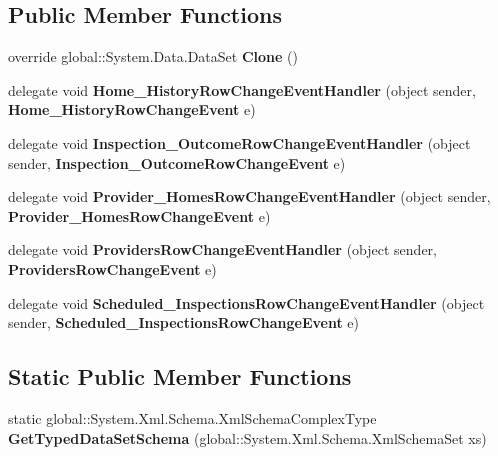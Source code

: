 \subsection*{Public Member Functions}
\begin{DoxyCompactItemize}
\item 
\mbox{\label{class_a_f_h___scheduler_1_1_home_inspection_data_set_a0c26672e3af1576d1e41972377c41660}} 
override global\+::\+System.\+Data.\+Data\+Set {\bfseries Clone} ()
\item 
\mbox{\label{class_a_f_h___scheduler_1_1_home_inspection_data_set_a18755c0086a65c9383ad21393a136f69}} 
delegate void {\bfseries Home\+\_\+\+History\+Row\+Change\+Event\+Handler} (object sender, \textbf{ Home\+\_\+\+History\+Row\+Change\+Event} e)
\item 
\mbox{\label{class_a_f_h___scheduler_1_1_home_inspection_data_set_a25cfb2a40648751561167509d949e2af}} 
delegate void {\bfseries Inspection\+\_\+\+Outcome\+Row\+Change\+Event\+Handler} (object sender, \textbf{ Inspection\+\_\+\+Outcome\+Row\+Change\+Event} e)
\item 
\mbox{\label{class_a_f_h___scheduler_1_1_home_inspection_data_set_a75d223ce70ef4ddb10e760fa13d78f54}} 
delegate void {\bfseries Provider\+\_\+\+Homes\+Row\+Change\+Event\+Handler} (object sender, \textbf{ Provider\+\_\+\+Homes\+Row\+Change\+Event} e)
\item 
\mbox{\label{class_a_f_h___scheduler_1_1_home_inspection_data_set_a4c2cfa9ccfc514d0f90a416b7abe6336}} 
delegate void {\bfseries Providers\+Row\+Change\+Event\+Handler} (object sender, \textbf{ Providers\+Row\+Change\+Event} e)
\item 
\mbox{\label{class_a_f_h___scheduler_1_1_home_inspection_data_set_ac84dcf15a4d178fea9fb81756b2b35f4}} 
delegate void {\bfseries Scheduled\+\_\+\+Inspections\+Row\+Change\+Event\+Handler} (object sender, \textbf{ Scheduled\+\_\+\+Inspections\+Row\+Change\+Event} e)
\end{DoxyCompactItemize}
\subsection*{Static Public Member Functions}
\begin{DoxyCompactItemize}
\item 
\mbox{\label{class_a_f_h___scheduler_1_1_home_inspection_data_set_afb86c174b292dc1245e94e9bebfacb30}} 
static global\+::\+System.\+Xml.\+Schema.\+Xml\+Schema\+Complex\+Type {\bfseries Get\+Typed\+Data\+Set\+Schema} (global\+::\+System.\+Xml.\+Schema.\+Xml\+Schema\+Set xs)
\end{DoxyCompactItemize}
